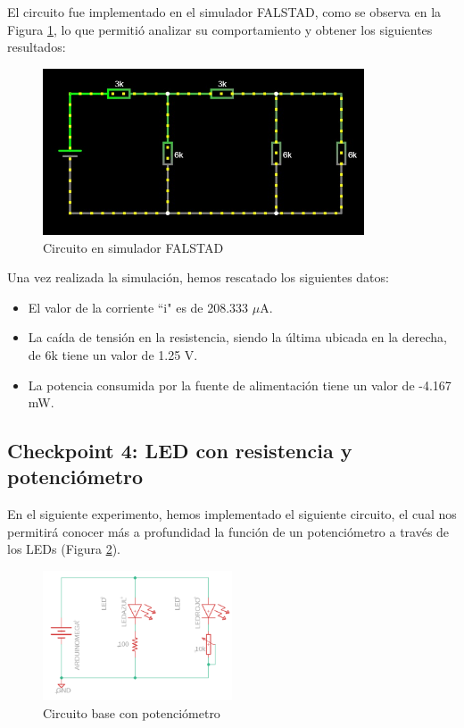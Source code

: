 \documentclass{article}
\begin{document}
El circuito fue implementado en el simulador FALSTAD, como se observa en la Figura \ref{fig:simulacion_esquema3}, lo que permitió analizar su comportamiento y obtener los siguientes resultados:

\begin{figure}[H]
    \centering
    \includegraphics[width=0.85\textwidth]{./img/Falstad.jpeg}
    \caption{Circuito en simulador FALSTAD}
    \label{fig:simulacion_esquema3}
\end{figure}

Una vez realizada la simulación, hemos rescatado los siguientes datos:
\begin{itemize}
    \item El valor de la corriente ``i" es de 208.333 $\mu$A.
    \item La caída de tensión en la resistencia, siendo la última ubicada en la derecha, de 6k tiene un valor de 1.25 V.
    \item La potencia consumida por la fuente de alimentación tiene un valor de -4.167 mW.
\end{itemize}

\subsection{Checkpoint 4: LED con resistencia y potenciómetro}
En el siguiente experimento, hemos implementado el siguiente circuito, el cual nos permitirá conocer más a profundidad la función de un potenciómetro a través de los LEDs (Figura \ref{fig:simulacion_esquema4}).

\begin{figure}[H]
    \centering
    \includegraphics[width=0.50\textwidth]{./img/Circuito-potenciometro.png}
    \caption{Circuito base con potenciómetro}
    \label{fig:simulacion_esquema4}
\end{figure}
\end{document}
